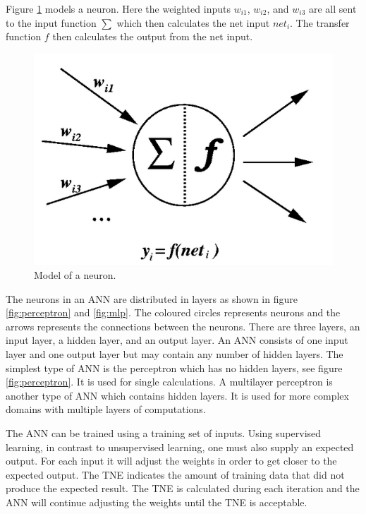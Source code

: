 Figure \ref{fig:neuron} models a neuron. Here the weighted inputs $w_{i1}$, $w_{i2}$, and $w_{i3}$ are all sent to the input function $\sum$ which then calculates the net input $net_{i}$. The transfer function $f$ then calculates the output from the net input.

\begin{figure}[H]
  \center
    \includegraphics[scale=0.4]{images/nn/neuron.png}
  \caption{Model of a neuron.\cite{neuron} \label{fig:neuron}}
\end{figure}

The neurons in an ANN are distributed in layers as shown in figure \ref{fig:perceptron} and \ref{fig:mlp}. The coloured circles represents neurons and the arrows represents the connections between the neurons. There are three layers, an input layer, a hidden layer, and an output layer. An ANN consists of one input layer and one output layer but may contain any number of hidden layers. The simplest type of ANN is the perceptron which has no hidden layers, see figure \ref{fig:perceptron}. It is used for single calculations. A multilayer perceptron is another type of ANN which contains hidden layers. It is used for more complex domains with multiple layers of computations. 


\vspace{4mm}


The ANN can be trained using a training set of inputs. Using supervised learning, in contrast to unsupervised learning, one must also supply an expected output. For each input it will adjust the weights in order to get closer to the expected output. The TNE indicates the amount of training data that did not produce the expected result. The TNE is calculated during each iteration and the ANN will continue adjusting the weights until the TNE is acceptable. 

